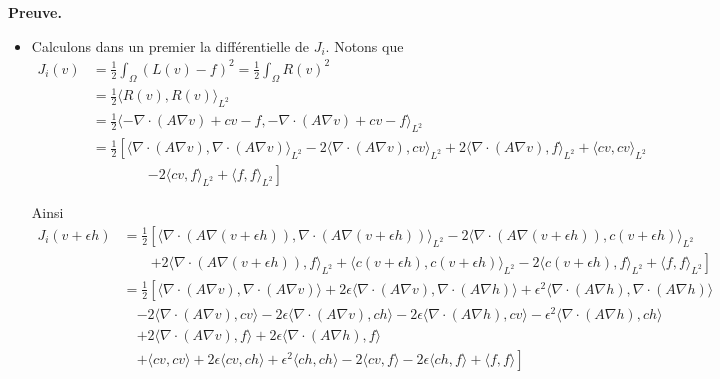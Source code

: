 \documentclass[french]{article}
\newenvironment{preuve}[1][]{\begin{tcolorbox}[
	colback=white, %
	colframe=green!70!black, %
	arc=2mm, %
	boxrule=1pt, %
	breakable, enhanced jigsaw
	]
	\textcolor{green!70!black}{\textbf{Preuve.} \\}

	#1
}{\end{tcolorbox}}
\begin{document}
\begin{itemize}[label=]
\begin{preuve}
			\begin{itemize}[label=\textbullet]
				\item Calculons dans un premier la différentielle de $J_{i}$. Notons que
				\begin{align*}
					J_i(v) &= \frac{1}{2} \int_{\Omega} (L(v) - f)^2=\frac{1}{2} \int_{\Omega} R(v)^2 \\
					&= \frac{1}{2}\langle R(v), R(v) \rangle_{L^2} \\
					&= \frac{1}{2}\langle -\nabla\cdot(A\nabla v) + cv - f, -\nabla\cdot(A\nabla v) + cv - f \rangle_{L^2} \\
					&= \frac{1}{2}\left[\langle \nabla\cdot(A\nabla v), \nabla\cdot(A\nabla v) \rangle_{L^2} -2 \langle \nabla\cdot(A\nabla v), cv \rangle_{L^2} +2 \langle \nabla\cdot(A\nabla v), f \rangle_{L^2} + \langle cv, cv \rangle_{L^2}\right. \\
					& \qquad \qquad \left.-2 \langle cv,f\rangle_{L^2} + \langle f, f \rangle_{L^2}\right]
				\end{align*}

				Ainsi
				\begin{align*}
					J_i(v+\epsilon h)&= \frac{1}{2}\left[\langle \nabla\cdot(A\nabla (v+\epsilon h)), \nabla\cdot(A\nabla (v+\epsilon h)) \rangle_{L^2} -2 \langle \nabla\cdot(A\nabla (v+\epsilon h)), c(v+\epsilon h) \rangle_{L^2}\right. \\
					& \qquad \left. + 2 \langle \nabla\cdot(A\nabla (v+\epsilon h)), f \rangle_{L^2} + \langle c(v+\epsilon h), c(v+\epsilon h) \rangle_{L^2} -2 \langle c(v+\epsilon h),f\rangle_{L^2} + \langle f, f \rangle_{L^2}\right] \\
					&= \frac{1}{2}\left[\langle \nabla\cdot(A\nabla v), \nabla\cdot(A\nabla v) \rangle +2\epsilon\langle \nabla\cdot(A\nabla v), \nabla\cdot(A\nabla h) \rangle +\epsilon^2\langle \nabla\cdot(A\nabla h), \nabla\cdot(A\nabla h) \rangle\right. \\
					& \quad \left.-2 \langle \nabla\cdot(A\nabla v), cv \rangle-2\epsilon \langle \nabla\cdot(A\nabla v), ch \rangle-2\epsilon \langle \nabla\cdot(A\nabla h), cv \rangle-\epsilon^2 \langle \nabla\cdot(A\nabla h), ch \rangle\right. \\
					& \quad \left. + 2 \langle \nabla\cdot(A\nabla v), f \rangle+ 2\epsilon \langle \nabla\cdot(A\nabla h), f \rangle \right. \\
					& \quad \left. + \langle cv, cv \rangle+2\epsilon \langle cv, ch \rangle + \epsilon^2 \langle ch, ch \rangle -2 \langle cv,f\rangle-2\epsilon \langle ch,f\rangle + \langle f, f \rangle\right]
				\end{align*}
	

\end{itemize}
\end{preuve}
\end{itemize}
\end{document}
